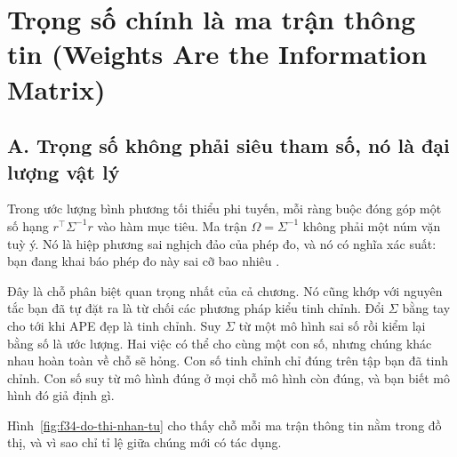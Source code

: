 \documentclass[../../deep_learning.tex]{subfiles}
\begin{document}
\section{Trọng số chính là ma trận thông tin (Weights Are the Information Matrix)}

\subsection{A. Trọng số không phải siêu tham số, nó là đại lượng vật lý}

Trong ước lượng bình phương tối thiểu phi tuyến, mỗi ràng buộc đóng góp một số hạng \(r^{\top}\Sigma^{-1} r\) vào hàm mục tiêu. Ma trận \(\Omega = \Sigma^{-1}\) không phải một núm vặn tuỳ ý. Nó là hiệp phương sai nghịch đảo của phép đo, và nó có nghĩa xác suất: bạn đang khai báo phép đo này sai cỡ bao nhiêu \cite{barfoot2017}.

Đây là chỗ phân biệt quan trọng nhất của cả chương. Nó cũng khớp với nguyên tắc bạn đã tự đặt ra là từ chối các phương pháp kiểu tinh chỉnh. Đổi \(\Sigma\) bằng tay cho tới khi APE đẹp là tinh chỉnh. Suy \(\Sigma\) từ một mô hình sai số rồi kiểm lại bằng số là ước lượng. Hai việc có thể cho cùng một con số, nhưng chúng khác nhau hoàn toàn về chỗ sẽ hỏng. Con số tinh chỉnh chỉ đúng trên tập bạn đã tinh chỉnh. Con số suy từ mô hình đúng ở mọi chỗ mô hình còn đúng, và bạn biết mô hình đó giả định gì.

Hình~\ref{fig:f34-do-thi-nhan-tu} cho thấy chỗ mỗi ma trận thông tin nằm trong đồ thị, và vì sao chỉ tỉ lệ giữa chúng mới có tác dụng.
\end{document}
